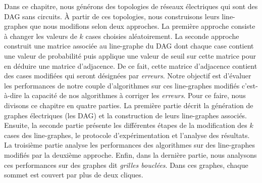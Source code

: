 Dans ce chapitre, nous g\'en\'erons des topologies de r\'eseaux \'electriques qui sont des DAG sans circuits. \`A partir de ces topologies, nous construisons leurs line-graphes  que nous modifions selon  deux approches.
La premi\`ere approche consiste \`a changer les valeurs de $k$ cases choisies al\'eatoirement.
La seconde approche construit une matrice associ\'ee au line-graphe du DAG dont chaque case contient une valeur de probabilit\'e puis applique une valeur de seuil sur cette matrice pour en d\'eduire une matrice d'adjacence. De ce fait, cette matrice d'adjacence contient des cases modifi\'ees qui seront d\'esign\'ees par {\em erreurs}. 
\newline
Notre objectif est d'\'evaluer les performances de notre couple d'algorithmes sur ces line-graphes modifi\'es c'est-\`a-dire la capacit\'e de nos algorithmes \`a corriger les {\em erreurs}.
 Pour ce faire, nous divisons ce chapitre en quatre parties. 
 La premi\`ere partie d\'ecrit la g\'en\'eration de graphes \'electriques (les DAG) et la construction de leurs line-graphes associ\'es. 
 Ensuite, la seconde partie pr\'esente les diff\'erentes \'etapes de la modification des $k$ cases des line-graphes, le protocole d'exp\'erimentation et l'analyse des r\'esultats.
 La troisi\`eme partie  analyse les performances des algorithmes sur des
 line-graphes modifi\'es par la deuxi\`eme approche.
 Enfin, dans la derni\`ere partie, nous analysons ces performances sur des graphes dit {\em grilles boucl\'ees}. Dans ces graphes, chaque sommet est couvert par plus de deux cliques.